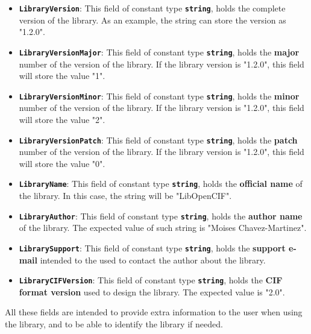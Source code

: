 \documentclass[11pt,twoside,openany,x11names,svgnames]{memoir}
\begin{document}
\begin{itemize}
	\item \textbf{\texttt{LibraryVersion}}: This field of constant type \textbf{\texttt{string}}, holds the complete version of the library. As an example, the string can store the version as "1.2.0".
	
	\item \textbf{\texttt{LibraryVersionMajor}}: This field of constant type \textbf{\texttt{string}}, holds the \textbf{major} number of the version of the library. If the library version is "1.2.0", this field will store the value "1".
	
	\item \textbf{\texttt{LibraryVersionMinor}}: This field of constant type \textbf{\texttt{string}}, holds the \textbf{minor} number of the version of the library. If the library version is "1.2.0", this field will store the value "2".
	
	\item \textbf{\texttt{LibraryVersionPatch}}: This field of constant type \textbf{\texttt{string}}, holds the \textbf{patch} number of the version of the library. If the library version is "1.2.0", this field will store the value "0".
	
	\item \textbf{\texttt{LibraryName}}: This field of constant type \textbf{\texttt{string}}, holds the \textbf{official name} of the library. In this case, the string will be "LibOpenCIF".
	
	\item \textbf{\texttt{LibraryAuthor}}: This field of constant type \textbf{\texttt{string}}, holds the \textbf{author name} of the library. The expected value of such string is "Moises Chavez-Martinez".
	
	\item \textbf{\texttt{LibrarySupport}}: This field of constant type \textbf{\texttt{string}}, holds the \textbf{support e-mail} intended to the used to contact the author about the library.
	
	\item \textbf{\texttt{LibraryCIFVersion}}: This field of constant type \textbf{\texttt{string}}, holds the \textbf{CIF format version} used to design the library. The expected value is "2.0".
\end{itemize}

All these fields are intended to provide extra information to the user when using the library, and to be able to identify the library if needed.
\end{document}

